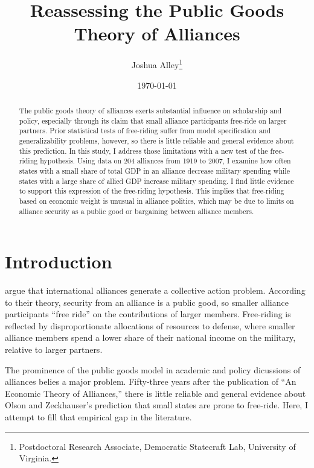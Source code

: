 \documentclass[12pt]{article}
\title{
\textbf{Reassessing the Public Goods Theory of Alliances}
	}
\author{Joshua Alley\footnote{Postdoctoral Research Associate,
Democratic Statecraft Lab, University of Virginia.}}
\date{{\normalsize \today}}
\begin{document}
\maketitle 

\doublespace

\begin{abstract}
The public goods theory of alliances exerts substantial influence on scholarship and policy, especially through its claim that small alliance participants free-ride on larger partners. 
Prior statistical tests of free-riding suffer from model specification and generalizability problems, however, so there is little reliable and general evidence about this prediction.
In this study, I address those limitations with a new test of the free-riding hypothesis. 
Using data on 204 alliances from 1919 to 2007, I examine how often states with a small share of total GDP in an alliance decrease military spending while states with a large share of allied GDP increase military spending. 
I find little evidence to support this expression of the free-riding hypothesis. 
This implies that free-riding based on economic weight is unusual in alliance politics, which may be due to limits on alliance security as a public good or bargaining between alliance members. 
\end{abstract} 

\newpage


\section{Introduction}



\citet{OlsonZeckhauser1966} argue that international alliances generate a collective action problem. 
According to their theory, security from an alliance is a public good, so smaller alliance participants ``free ride'' on the contributions of larger members. 
Free-riding is reflected by disproportionate allocations of resources to defense, where smaller alliance members spend a lower share of their national income on the military, relative to larger partners.


The prominence of the public goods model in academic and policy dicussions of alliances belies a major problem.
Fifty-three years after the publication of ``An Economic Theory of Alliances,'' there is little reliable and general evidence about Olson and Zeckhauser's prediction that small states are prone to free-ride. 
Here, I attempt to fill that empirical gap in the literature. 
\end{document}
